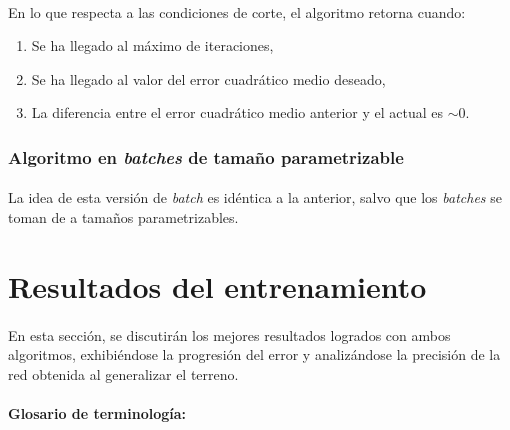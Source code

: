 \documentclass[12pt, twocolumn]{article}
\begin{document}
	\paragraph{} En lo que respecta a las condiciones de corte, el algoritmo retorna cuando:
	
	\begin{enumerate}
		\item Se ha llegado al máximo de iteraciones,
		\item Se ha llegado al valor del error cuadrático medio deseado,
		\item La diferencia entre el error cuadrático medio anterior y el actual es $\sim 0$.
	\end{enumerate}
	
	\subsubsection{Algoritmo en \textit{batches} de tamaño parametrizable}
	
	\paragraph{} La idea de esta versión de \textit{batch} es idéntica a la anterior, salvo que los \textit{batches} se toman de a tamaños parametrizables.
	
	\newpage
	
	\section{Resultados del entrenamiento}
	
	\paragraph{} En esta sección, se discutirán los mejores resultados logrados con ambos algoritmos, exhibiéndose la progresión del error y analizándose la precisión de la red obtenida al generalizar el terreno.
	
	\paragraph{Glosario de terminología:}
	
\end{document}
